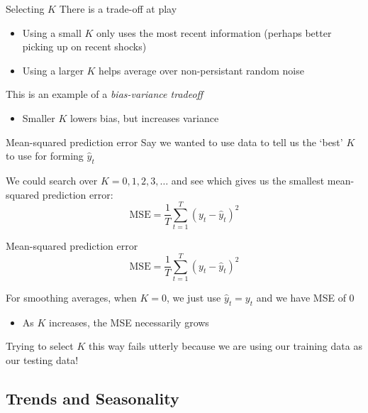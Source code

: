 \documentclass[aspectratio=169,t,11pt,table]{beamer}
\begin{document}
\begin{frame}{Selecting $K$}
  There is a trade-off at play
  \begin{itemize}
    \item Using a small $K$ only uses the most recent information (perhaps better picking up on recent shocks)
    
    \item Using a larger $K$ helps average over non-persistant random noise
  \end{itemize}

  \pause
  \bigskip
  This is an example of a \emph{bias-variance tradeoff}
  \begin{itemize}
    \item Smaller $K$ lowers bias, but increases variance
  \end{itemize}
\end{frame}

\begin{frame}{Mean-squared prediction error}
  Say we wanted to use data to tell us the `best' $K$ to use for forming $\hat{y}_t$

  \bigskip
  We could search over $K = 0, 1, 2, 3, \dots$ and see which gives us the smallest mean-squared prediction error:
  $$
    \text{MSE} = \frac{1}{T} \sum_{t=1}^T (y_t - \hat{y}_t)^2
  $$
\end{frame}

\begin{frame}{Mean-squared prediction error}
  \vspace*{-\bigskipamount}
  $$
    \text{MSE} = \frac{1}{T} \sum_{t=1}^T (y_t - \hat{y}_t)^2
  $$
  
  \bigskip
  For smoothing averages, when $K = 0$, we just use $\hat{y}_t = y_t$ and we have MSE of $0$
  \begin{itemize}
    \item As $K$ increases, the MSE necessarily grows
  \end{itemize}

  \bigskip
  Trying to select $K$ this way fails utterly because we are using our training data as our testing data!
\end{frame}


\subsection{Trends and Seasonality}
\end{document}
